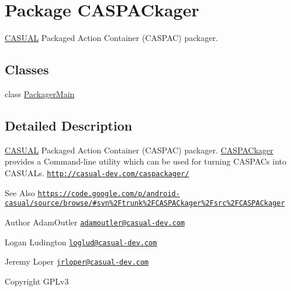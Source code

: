\hypertarget{namespaceCASPACkager}{\section{Package C\-A\-S\-P\-A\-Ckager}
\label{namespaceCASPACkager}
}


\hyperlink{namespaceCASUAL}{C\-A\-S\-U\-A\-L} Packaged Action Container (C\-A\-S\-P\-A\-C) packager.  


\subsection*{Classes}
\begin{DoxyCompactItemize}
\item 
class \hyperlink{classCASPACkager_1_1PackagerMain}{Packager\-Main}
\end{DoxyCompactItemize}


\subsection{Detailed Description}
\hyperlink{namespaceCASUAL}{C\-A\-S\-U\-A\-L} Packaged Action Container (C\-A\-S\-P\-A\-C) packager. \hyperlink{namespaceCASPACkager}{C\-A\-S\-P\-A\-Ckager} provides a Command-\/line utility which can be used for turning C\-A\-S\-P\-A\-Cs into C\-A\-S\-U\-A\-Ls. \href{http://casual-dev.com/caspackager/}{\tt http\-://casual-\/dev.\-com/caspackager/} \begin{DoxySeeAlso}{See Also}
\href{https://code.google.com/p/android-casual/source/browse/#svn%2Ftrunk%2FCASPACkager%2Fsrc%2FCASPACkager}{\tt https\-://code.\-google.\-com/p/android-\/casual/source/browse/\#svn\%2\-Ftrunk\%2\-F\-C\-A\-S\-P\-A\-Ckager\%2\-Fsrc\%2\-F\-C\-A\-S\-P\-A\-Ckager} 
\end{DoxySeeAlso}
\begin{DoxyAuthor}{Author}
Adam\-Outler \href{mailto:adamoutler@casual-dev.com}{\tt adamoutler@casual-\/dev.\-com} 

Logan Ludington \href{mailto:loglud@casual-dev.com}{\tt loglud@casual-\/dev.\-com} 

Jeremy Loper \href{mailto:jrloper@casual-dev.com}{\tt jrloper@casual-\/dev.\-com} 
\end{DoxyAuthor}
\begin{DoxyCopyright}{Copyright}
G\-P\-Lv3 
\end{DoxyCopyright}
